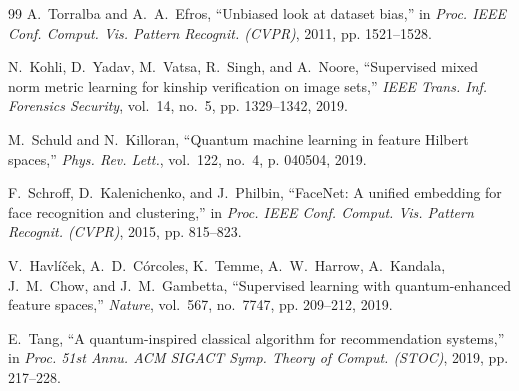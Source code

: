 \documentclass[journal,12pt]{IEEEtran}
\begin{document}
\begin{thebibliography}{99}
A.~Torralba and A.~A.~Efros, ``Unbiased look at dataset bias,'' in \emph{Proc. IEEE Conf. Comput. Vis. Pattern Recognit. (CVPR)}, 2011, pp. 1521--1528.

N.~Kohli, D.~Yadav, M.~Vatsa, R.~Singh, and A.~Noore, ``Supervised mixed norm metric learning for kinship verification on image sets,'' \emph{IEEE Trans. Inf. Forensics Security}, vol.~14, no.~5, pp. 1329--1342, 2019.

M.~Schuld and N.~Killoran, ``Quantum machine learning in feature Hilbert spaces,'' \emph{Phys. Rev. Lett.}, vol.~122, no.~4, p. 040504, 2019.

F.~Schroff, D.~Kalenichenko, and J.~Philbin, ``FaceNet: A unified embedding for face recognition and clustering,'' in \emph{Proc. IEEE Conf. Comput. Vis. Pattern Recognit. (CVPR)}, 2015, pp. 815--823.

V.~Havl{\'i}{\v{c}}ek, A.~D.~C{\'o}rcoles, K.~Temme, A.~W.~Harrow, A.~Kandala, J.~M.~Chow, and J.~M.~Gambetta, ``Supervised learning with quantum-enhanced feature spaces,'' \emph{Nature}, vol.~567, no.~7747, pp. 209--212, 2019.

E.~Tang, ``A quantum-inspired classical algorithm for recommendation systems,'' in \emph{Proc. 51st Annu. ACM SIGACT Symp. Theory of Comput. (STOC)}, 2019, pp. 217--228.

\end{thebibliography}
\end{document}
